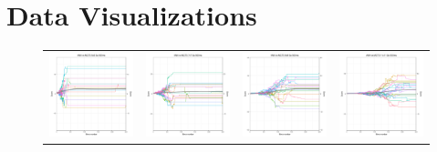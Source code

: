 %
%

\chapter{Data Visualizations}\label{appa:data}
\begin{figure}
\centering
\begin{tabular}{cccc}
\hspace{-0.5cm}\includegraphics[width = 1.55in]{images/Visualizations/ANNvsMCTS/500ms5x5.png} &
\hspace{-0.5cm}\includegraphics[width = 1.55in]{images/Visualizations/ANNvsMCTS/500ms7x7.png} &
\hspace{-0.5cm}\includegraphics[width = 1.55in]{images/Visualizations/ANNvsMCTS/500ms9x9.png} &
\hspace{-0.5cm}\includegraphics[width = 1.55in]{images/Visualizations/ANNvsMCTS/500ms11x11.png} \\


\end{tabular}
\end{figure}
